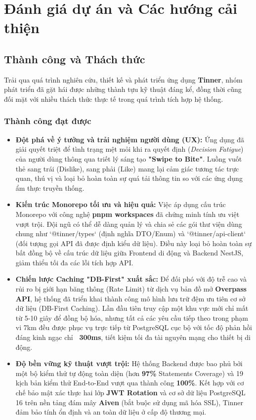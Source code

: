 \section{Đánh giá dự án và Các hướng cải thiện}
\label{sec:project_evaluation}

\subsection{Thành công và Thách thức}
\label{subsec:achievements_challenges}

Trải qua quá trình nghiên cứu, thiết kế và phát triển ứng dụng \textbf{Tinner}, nhóm phát triển đã gặt hái được những thành tựu kỹ thuật đáng kể, đồng thời cũng đối mặt với nhiều thách thức thực tế trong quá trình tích hợp hệ thống.

\subsubsection{Thành công đạt được}
\begin{itemize}
    \item \textbf{Đột phá về ý tưởng và trải nghiệm người dùng (UX):} Ứng dụng đã giải quyết triệt để tình trạng mệt mỏi khi ra quyết định (\textit{Decision Fatigue}) của người dùng thông qua triết lý sáng tạo \textbf{"Swipe to Bite"}. Luồng vuốt thẻ sang trái (Dislike), sang phải (Like) mang lại cảm giác tương tác trực quan, thú vị và loại bỏ hoàn toàn sự quá tải thông tin so với các ứng dụng ẩm thực truyền thống.
    \item \textbf{Kiến trúc Monorepo tối ưu và hiệu quả:} Việc áp dụng cấu trúc Monorepo với công nghệ \textbf{pnpm workspaces} đã chứng minh tính ưu việt vượt trội. Đội ngũ có thể dễ dàng quản lý và chia sẻ các gói thư viện dùng chung như `@tinner/types` (định nghĩa DTO/Enum) và `@tinner/api-client` (đối tượng gọi API đã được định kiểu dữ liệu). Điều này loại bỏ hoàn toàn sự bất đồng bộ về cấu trúc dữ liệu giữa Frontend di động và Backend NestJS, giảm thiểu tối đa các lỗi tích hợp API.
    \item \textbf{Chiến lược Caching "DB-First" xuất sắc:} Để đối phó với độ trễ cao và rủi ro bị giới hạn băng thông (Rate Limit) từ dịch vụ bản đồ mở \textbf{Overpass API}, hệ thống đã triển khai thành công mô hình lưu trữ đệm ưu tiên cơ sở dữ liệu (DB-First Caching). Lần đầu tiên truy cập một khu vực mới chỉ mất từ 5-10 giây để đồng bộ hóa, nhưng tất cả các yêu cầu tiếp theo trong phạm vi 7km đều được phục vụ trực tiếp từ PostgreSQL cục bộ với tốc độ phản hồi đáng kinh ngạc chỉ \textbf{~300ms}, tiết kiệm tối đa tài nguyên mạng cho thiết bị di động.
    \item \textbf{Độ bền vững kỹ thuật vượt trội:} Hệ thống Backend được bao phủ bởi một bộ kiểm thử tự động toàn diện (hơn \textbf{97\%} Statements Coverage) và 19 kịch bản kiểm thử End-to-End vượt qua thành công \textbf{100\%}. Kết hợp với cơ chế bảo mật xác thực hai lớp \textbf{JWT Rotation} và cơ sở dữ liệu PostgreSQL 16 trên nền tảng đám mây \textbf{Aiven} (bắt buộc sử dụng mã hóa SSL), Tinner đảm bảo tính ổn định và an toàn dữ liệu ở cấp độ thương mại.
\end{itemize}

